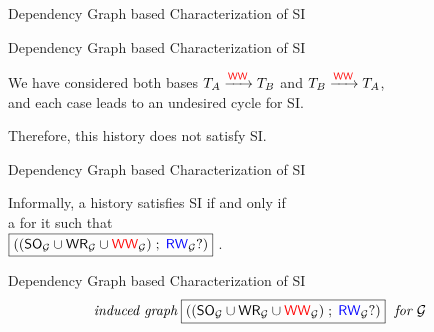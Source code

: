 \begin{frame}{Dependency Graph based Characterization of SI}
	\begin{center}

		\vspace{0.20cm}
		{}
		\vspace{0.20cm}

	\end{center}
\end{frame}

\begin{frame}{Dependency Graph based Characterization of SI}
  \begin{center}
		We have considered both bases $T_{A} \xrightarrow{\textcolor{red}{\textup{\textsf{WW}}}} T_{B}$
		and $T_{B} \xrightarrow{\textcolor{red}{\textup{\textsf{WW}}}} T_{A}$, \\[2pt]
		and each case leads to an undesired cycle for SI.

		\vspace{0.20cm}
		\vspace{0.20cm}

		Therefore, this history does not satisfy SI.
  \end{center}
\end{frame}

\begin{frame}{Dependency Graph based Characterization of SI}
	\begin{theorem}
		Informally, a history satisfies SI if and only if \\[3pt]
		 a  for it such that \\[3pt]
		 ${\boxed{((\textup{\textsf{SO}}_{\mathcal{G}} \cup \textup{\textsf{WR}}_{\mathcal{G}} \cup \textcolor{red}{\textup{\textsf{WW}}}_{\mathcal{G}}) \;;\; \textcolor{blue}{\textup{\textsf{RW}}}_{\mathcal{G}}?)}}$ .
	\end{theorem}
\end{frame}

\begin{frame}{Dependency Graph based Characterization of SI}
	\[
		\text{\it induced graph}\; {\boxed{((\textup{\textsf{SO}}_{\mathcal{G}} \cup \textup{\textsf{WR}}_{\mathcal{G}} \cup \textcolor{red}{\textup{\textsf{WW}}}_{\mathcal{G}}) \;;\; \textcolor{blue}{\textup{\textsf{RW}}}_{\mathcal{G}}?)}} \text{\it\; for $\mathcal{G}$}
	\]

	\begin{center}
		\resizebox{0.60\textwidth}{!}{}
		\vspace{0.30cm}


		\vspace{0.20cm}
	\end{center}
\end{frame}

